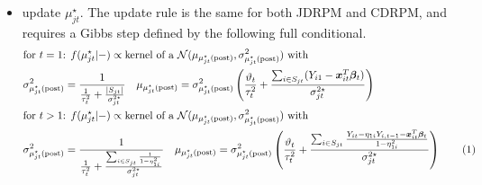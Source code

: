 \documentclass[12pt,	%
	a4paper,		%
	twoside,		%
	openright,		%
	titlepage,%
	]{book}
\newcommand\numberthis{\addtocounter{equation}{1}\tag{\theequation}}
\theoremstyle{definition}
\begin{document}
\begin{itemize}
\item update $\mu^\star_{jt}$. The update rule is the same for both JDRPM and CDRPM, and requires a Gibbs step defined by the following full conditional.
\begin{align*}
&\text{for $t=1$} \text{: }
 f(\mu^\star_{jt}|-) \propto \text{kernel of a $\N(\mu_{\postp{\mu^\star_{jt}}},\sigma^2_{\postp{\mu^\star_{jt}}})$ with}\\
&\sigma^2_{\postp{\mu^\star_{jt}}}=\frac{1}{\frac{1}{\tau^2_t}+\frac{|S_{jt}|}{\sigma^{2\star}_{jt}}}\quad
%
\mu_{\postp{\mu^\star_{jt}}}=\sigma^2_{\postp{\mu^\star_{jt}}}\left( \frac{\theta_t}{\tau_t^2} + \frac{\sum_{i \in S_{jt}} (Y_{i1}-\vec{x}_{it}^T\vec{\beta}_t)}{\sigma^{2\star}_{jt}} \right)\\
&\text{for $t>1$} \text{: }
 f(\mu^\star_{jt}|-) \propto \text{kernel of a $\N(\mu_{\postp{\mu^\star_{jt}}},\sigma^2_{\postp{\mu^\star_{jt}}})$ with}\\
&\sigma^2_{\postp{\mu^\star_{jt}}}=\frac{1}{\frac{1}{\tau_t^2}+\frac{\sum_{i \in S_{jt}} \frac{1}{1-\eta_{1i}^2}}{\sigma^{2\star}_{jt}}}\quad
%
\mu_{\postp{\mu^\star_{jt}}}=\sigma^2_{\postp{\mu^\star_{jt}}}\left( \frac{\theta_t}{\tau_t^2} + \frac{\sum_{i \in S_{jt}} \frac{Y_{it}-\eta_{1i}Y_{i,t-1}-\vec{x}_{it}^T\vec{\beta}_t}{1-\eta_{1i}^2}}{\sigma_{jt}^{2\star}} \right)
 \numberthis \label{update muh}
\end{align*}



\end{itemize}
\end{document}
